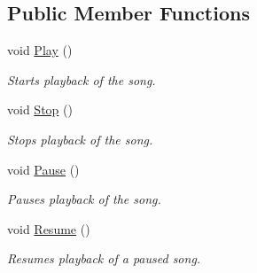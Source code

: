 \subsection*{Public Member Functions}
\begin{DoxyCompactItemize}
\item 
void \hyperlink{interface_tri_devs_1_1_tri_engine2_d_1_1_audio_1_1_i_song_aa74ea0cbad5692f36956eee31c50a6ad}{Play} ()
\begin{DoxyCompactList}\small\item\em Starts playback of the song. \end{DoxyCompactList}\item 
void \hyperlink{interface_tri_devs_1_1_tri_engine2_d_1_1_audio_1_1_i_song_a1777ba55d024dc7ba7288689d7eaa7de}{Stop} ()
\begin{DoxyCompactList}\small\item\em Stops playback of the song. \end{DoxyCompactList}\item 
void \hyperlink{interface_tri_devs_1_1_tri_engine2_d_1_1_audio_1_1_i_song_a20f46283f7d75eeea4c482d4487940b4}{Pause} ()
\begin{DoxyCompactList}\small\item\em Pauses playback of the song. \end{DoxyCompactList}\item 
void \hyperlink{interface_tri_devs_1_1_tri_engine2_d_1_1_audio_1_1_i_song_ac7e2044d8ee146ad36fbfe7ffc6061fd}{Resume} ()
\begin{DoxyCompactList}\small\item\em Resumes playback of a paused song. \end{DoxyCompactList}\end{DoxyCompactItemize}
